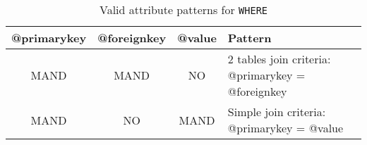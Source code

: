 \begin{table}[!htbp]
\small
\centering
\begin{tabulary}{\linewidth}{|c|c|c|J|}
    \hline 
        \textbf{@primarykey} &
        \textbf{@foreignkey} &
        \textbf{@value} &
        \textbf{Pattern}\\
    \hline      \hline  
        MAND &           
        MAND &           
        NO &           
        2 tables join criteria: @primarykey = @foreignkey \\
    \hline     
        MAND &           
        NO &           
        MAND &           
        Simple join criteria: @primarykey = @value \\
   \hline 
\end{tabulary}
     \caption{Valid attribute patterns for  \texttt{WHERE}}
     \label{tbl:where-pattern}
\end{table}